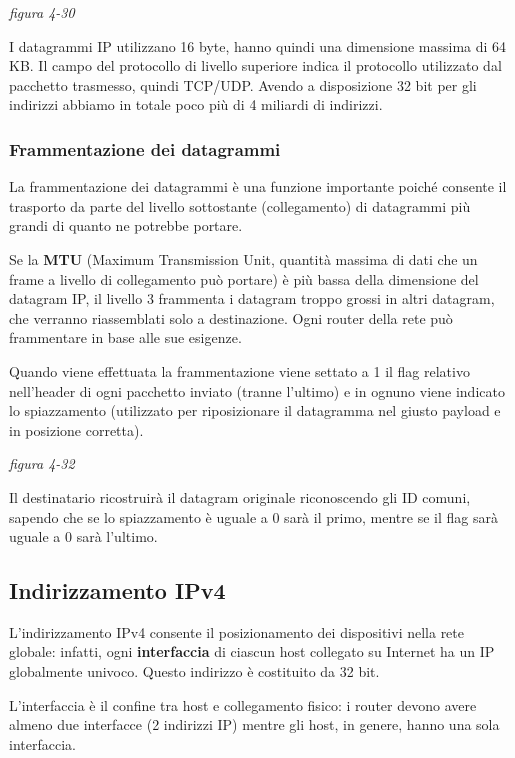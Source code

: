 \documentclass[
]{article}
\begin{document}
\emph{figura 4-30}

I datagrammi IP utilizzano 16 byte, hanno quindi una dimensione massima
di 64 KB. Il campo del protocollo di livello superiore indica il
protocollo utilizzato dal pacchetto trasmesso, quindi TCP/UDP. Avendo a
disposizione 32 bit per gli indirizzi abbiamo in totale poco più di 4
miliardi di indirizzi.

\hypertarget{header-n91}{%
\subsubsection{Frammentazione dei datagrammi}\label{header-n91}}

La frammentazione dei datagrammi è una funzione importante poiché
consente il trasporto da parte del livello sottostante (collegamento) di
datagrammi più grandi di quanto ne potrebbe portare.

Se la \textbf{MTU} (Maximum Transmission Unit, quantità massima di dati
che un frame a livello di collegamento può portare) è più bassa della
dimensione del datagram IP, il livello 3 frammenta i datagram troppo
grossi in altri datagram, che verranno riassemblati solo a destinazione.
Ogni router della rete può frammentare in base alle sue esigenze.

Quando viene effettuata la frammentazione viene settato a 1 il flag
relativo nell'header di ogni pacchetto inviato (tranne l'ultimo) e in
ognuno viene indicato lo spiazzamento (utilizzato per riposizionare il
datagramma nel giusto payload e in posizione corretta).

\emph{figura 4-32}

Il destinatario ricostruirà il datagram originale riconoscendo gli ID
comuni, sapendo che se lo spiazzamento è uguale a 0 sarà il primo,
mentre se il flag sarà uguale a 0 sarà l'ultimo.

\hypertarget{header-n97}{%
\subsection{Indirizzamento IPv4}\label{header-n97}}

L'indirizzamento IPv4 consente il posizionamento dei dispositivi nella
rete globale: infatti, ogni \textbf{interfaccia} di ciascun host
collegato su Internet ha un IP globalmente univoco. Questo indirizzo è
costituito da 32 bit.

L'interfaccia è il confine tra host e collegamento fisico: i router
devono avere almeno due interfacce (2 indirizzi IP) mentre gli host, in
genere, hanno una sola interfaccia.
\end{document}
